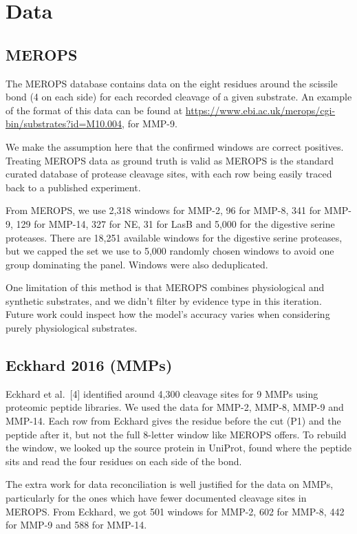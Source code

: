 \documentclass[10pt,a4paper]{article}
\numberwithin{equation}{section}
\newcommand{\cit}[1]{[#1]}
\begin{document}
\section{Data}
\label{sec:data}
\subsection{MEROPS}

The MEROPS database contains data on the eight residues around the scissile bond (4 on each side) for each recorded cleavage of a given substrate. An example of the format of this data can be found at \url{https://www.ebi.ac.uk/merops/cgi-bin/substrates?id=M10.004}, for MMP-9.

We make the assumption here that the confirmed windows are correct positives. Treating MEROPS data as ground truth is valid as MEROPS is the standard curated database of protease cleavage sites, with each row being easily traced back to a published experiment.

From MEROPS, we use 2,318 windows for MMP-2, 96 for MMP-8, 341 for MMP-9, 129 for MMP-14, 327 for NE, 31 for LasB and 5,000 for the digestive serine proteases. There are 18,251 available windows for the digestive serine proteases, but we capped the set we use to 5,000 randomly chosen windows to avoid one group dominating the panel. Windows were also deduplicated.

One limitation of this method is that MEROPS combines physiological and synthetic substrates, and we didn't filter by evidence type in this iteration. Future work could inspect how the model's accuracy varies when considering purely physiological substrates.

\subsection{Eckhard 2016 (MMPs)}

Eckhard et al.~\cit{4} identified around 4,300 cleavage sites for 9 MMPs using proteomic peptide libraries. We used the data for MMP-2, MMP-8, MMP-9 and MMP-14. Each row from Eckhard gives the residue before the cut (P1) and the peptide after it, but not the full 8-letter window like MEROPS offers. To rebuild the window, we looked up the source protein in UniProt, found where the peptide sits and read the four residues on each side of the bond. 

The extra work for data reconciliation is well justified for the data on MMPs, particularly for the ones which have fewer documented cleavage sites in MEROPS. From Eckhard, we got 501 windows for MMP-2, 602 for MMP-8, 442 for MMP-9 and 588 for MMP-14.
\end{document}
